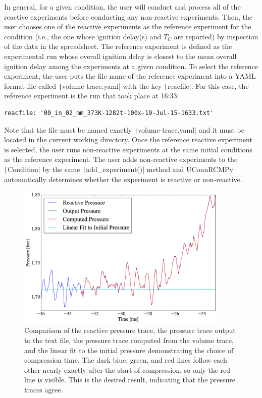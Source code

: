 \documentclass[12pt]{../ussci}
\begin{document}
In general, for a given condition, the user will conduct and process all
of the reactive experiments before conducting any non-reactive
experiments. Then, the user chooses one of the reactive experiments as
the reference experiment for the condition (i.e., the one whose ignition
delay(s) and \(T_C\) are reported) by inspection of the data in the
spreadsheet. The reference experiment is defined as the experimental run
whose overall ignition delay is closest to the mean overall ignition
delay among the experiments at a given condition. To select the
reference experiment, the user puts the file name of the reference
experiment into a YAML format file called \texttt|volume-trace.yaml|
with the key \texttt|reacfile|. For this case, the reference experiment
is the run that took place at 16:33:

\begin{verbatim}
reacfile: '00_in_02_mm_373K-1282t-100x-19-Jul-15-1633.txt'
\end{verbatim}

Note that the file must be named exactly \texttt|volume-trace.yaml| and
it must be located in the current working directory. Once the reference
reactive experiment is selected, the user runs non-reactive experiments
at the same initial conditions as the reference experiment. The user
adds non-reactive experiments to the \texttt|Condition| by the same
\texttt|add_experiment()| method and UConnRCMPy automatically
determines whether the experiment is reactive or non-reactive.

\begin{figure}[htbp]
\centering
\includegraphics[width=0.9\textwidth]{figures/pressure-comparison.png}
\caption{Comparison of the reactive pressure trace, the pressure trace
output to the text file, the pressure trace computed from the volume
trace, and the linear fit to the initial pressure demonstrating the
choice of compression time. The dark blue, green, and red lines follow
each other nearly exactly after the start of compression, so only the
red line is visible. This is the desired result, indicating that the
pressure traces agree.}
\label{fig:pressure-comparison}
\end{figure}
\end{document}
